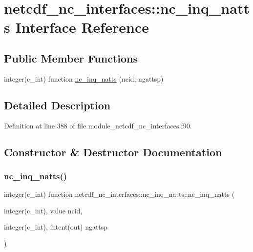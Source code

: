 \hypertarget{interfacenetcdf__nc__interfaces_1_1nc__inq__natts}{}\section{netcdf\+\_\+nc\+\_\+interfaces\+:\+:nc\+\_\+inq\+\_\+natts Interface Reference}
\label{interfacenetcdf__nc__interfaces_1_1nc__inq__natts}
\subsection*{Public Member Functions}
\begin{DoxyCompactItemize}
\item 
integer(c\+\_\+int) function \hyperlink{interfacenetcdf__nc__interfaces_1_1nc__inq__natts_a769cc95f1314da58e8638e632c1ec205}{nc\+\_\+inq\+\_\+natts} (ncid, ngattsp)
\end{DoxyCompactItemize}


\subsection{Detailed Description}


Definition at line 388 of file module\+\_\+netcdf\+\_\+nc\+\_\+interfaces.\+f90.



\subsection{Constructor \& Destructor Documentation}
\mbox{\label{interfacenetcdf__nc__interfaces_1_1nc__inq__natts_a769cc95f1314da58e8638e632c1ec205}} 
\subsubsection{\texorpdfstring{nc\+\_\+inq\+\_\+natts()}{nc\_inq\_natts()}}
{\footnotesize\ttfamily integer(c\+\_\+int) function netcdf\+\_\+nc\+\_\+interfaces\+::nc\+\_\+inq\+\_\+natts\+::nc\+\_\+inq\+\_\+natts (\begin{DoxyParamCaption}\item[{integer(c\+\_\+int), value}]{ncid,  }\item[{integer(c\+\_\+int), intent(out)}]{ngattsp }\end{DoxyParamCaption})}



